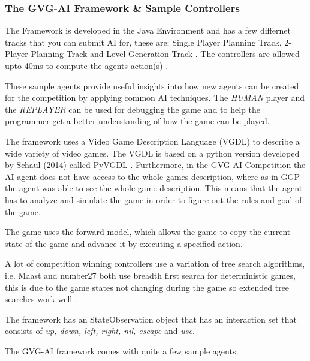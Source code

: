 \documentclass[journal]{IEEEtran}
\begin{document}
	

	\subsubsection{The GVG-AI Framework \& Sample Controllers} \label{Framework}
	
		The Framework is developed in the Java Environment and has a few differnet tracks that you can submit AI for, these are; Single Player Planning Track, 2-Player Planning Track and Level Generation Track \cite{gaina2016general}.
		The controllers are allowed upto 40ms to compute the agents action(s) \cite{perez2016GVGAICompetition, GVGAI}.
		
		
		These sample agents provide useful insights into how new agents can be created for the competition by applying common AI techniques.
		The \textit{HUMAN} player and the \textit{REPLAYER} can be used for debugging the game and to help the programmer get a better understanding of how the game can be played.
		
		
		The framework uses a Video Game Description Language (VGDL) to describe a wide variety of video games. The VGDL is based on a python version developed by Schaul (2014) called PyVGDL \cite{schuster2015mcts}. Furthermore, in the GVG-AI Competition the AI agent does not have access to the whole games description, where as in GGP the agent was able to see the whole game description. This means that the agent has to analyze and simulate the game in order to figure out the rules and goal of the game.

The game uses the forward model, which allows the game to copy the current state of the game and advance it by executing a specified action.

A lot of competition winning controllers use a variation of tree search algorithms, i.e. Maast and number27  \cite{schuster2015mcts} both use breadth first search for deterministic games, this is due to the game states not changing during the game so extended tree searches work well \cite{perez2018general}.
		
		The framework has an StateObservation object that has an interaction set that consists of \textit{up, down, left, right, nil, escape} and \textit{use}.

		The GVG-AI framework comes with quite a few sample agents;
		
\end{document}
